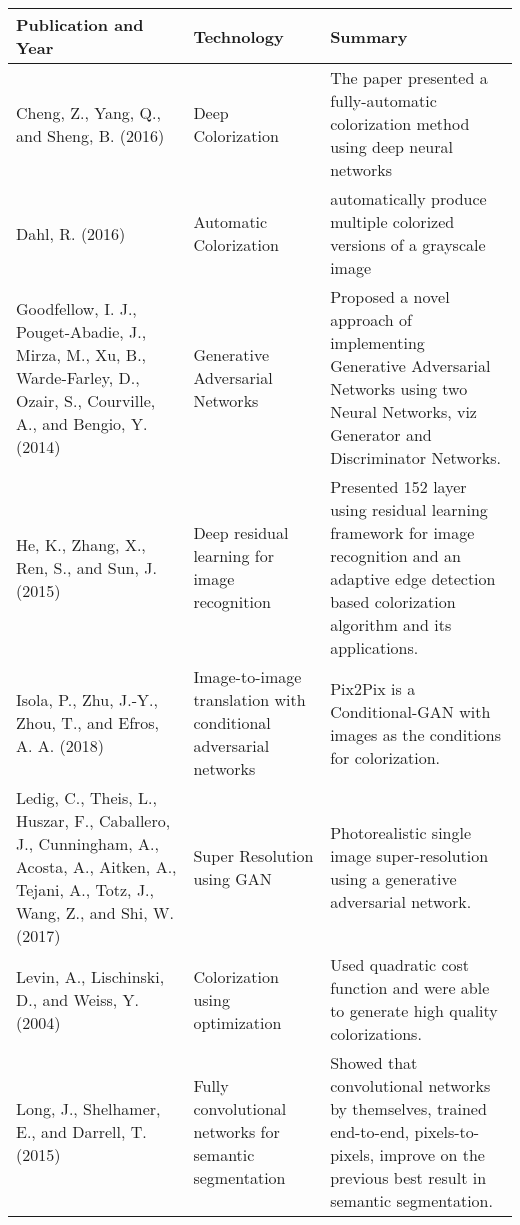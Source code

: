 \documentclass[12pt]{article}
\begin{document}
  \begin{tabularx}{\textwidth}{| X | X | X | } \hline
\textbf{Publication and Year} &	 \textbf{Technology} & \textbf{Summary} \\ \hline
Cheng, Z., Yang, Q., and Sheng, B. (2016) &	Deep Colorization &	 The paper presented a fully-automatic colorization method using deep neural networks\\ \hline

Dahl, R. (2016) &	Automatic Colorization & automatically produce multiple colorized versions of a grayscale image\\ \hline

Goodfellow, I. J., Pouget-Abadie, J., Mirza, M., Xu, B., Warde-Farley, D., Ozair, S., Courville, A., and Bengio, Y. (2014) & Generative Adversarial Networks & Proposed a novel approach of implementing Generative Adversarial Networks using two Neural Networks, viz Generator and Discriminator Networks.\\ \hline

He, K., Zhang, X., Ren, S., and Sun, J. (2015) & Deep residual learning for image recognition & Presented 152 layer using residual learning framework for image recognition and an adaptive edge detection based colorization algorithm and its applications.\\ \hline

Isola, P., Zhu, J.-Y., Zhou, T., and Efros, A. A. (2018) & Image-to-image translation with conditional adversarial networks &  Pix2Pix is a Conditional-GAN with images as the conditions for colorization.\\ \hline
Ledig, C., Theis, L., Huszar, F., Caballero, J., Cunningham, A., Acosta, A., Aitken, A., Tejani, A., Totz, J., Wang, Z., and Shi, W. (2017) &  Super Resolution using GAN & Photorealistic single image super-resolution using a generative adversarial network.\\ \hline

Levin, A., Lischinski, D., and Weiss, Y. (2004) &  Colorization using optimization & Used quadratic cost function and were able to generate high quality colorizations. \\ \hline

Long, J., Shelhamer, E., and Darrell, T. (2015) &  Fully convolutional networks for semantic segmentation &  Showed that convolutional networks by themselves, trained end-to-end, pixels-to-pixels, improve on the previous best result in semantic segmentation.\\ \hline


\end{tabularx}
\end{document}
